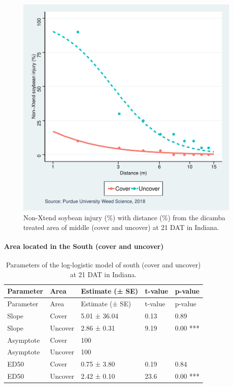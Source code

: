 \documentclass[]{article}
\let\oldparagraph\paragraph
\renewcommand{\paragraph}[1]{\oldparagraph{#1}\mbox{}}
\begin{document}
\begin{figure}
\centering
\includegraphics{Report_Dicamba_study_files/figure-latex/unnamed-chunk-30-1.pdf}
\caption{Non-Xtend soybean injury (\%) with distance (\%) from the
dicamba treated area of middle (cover and uncover) at 21 DAT in
Indiana.}
\end{figure}

\newpage

\paragraph{\texorpdfstring{Area located in the \textbf{South} (cover and
uncover)}{Area located in the South (cover and uncover)}}\label{area-located-in-the-south-cover-and-uncover}

\begin{longtable}[]{@{}lllll@{}}
\caption{Parameters of the log-logistic model of south (cover and
uncover) at 21 DAT in Indiana.}\tabularnewline
\toprule
Parameter & Area & Estimate (± SE) & t-value & p-value\tabularnewline
\midrule
\endfirsthead
\toprule
Parameter & Area & Estimate (± SE) & t-value & p-value\tabularnewline
\midrule
\endhead
Slope & Cover & 5.01 ± 36.04 & 0.13 & 0.89\tabularnewline
Slope & Uncover & 2.86 ± 0.31 & 9.19 & 0.00 ***\tabularnewline
Asymptote & Cover & 100 & &\tabularnewline
Asymptote & Uncover & 100 & &\tabularnewline
ED50 & Cover & 0.75 ± 3.80 & 0.19 & 0.84\tabularnewline
ED50 & Uncover & 2.42 ± 0.10 & 23.6 & 0.00 ***\tabularnewline
\bottomrule
\end{longtable}
\end{document}
